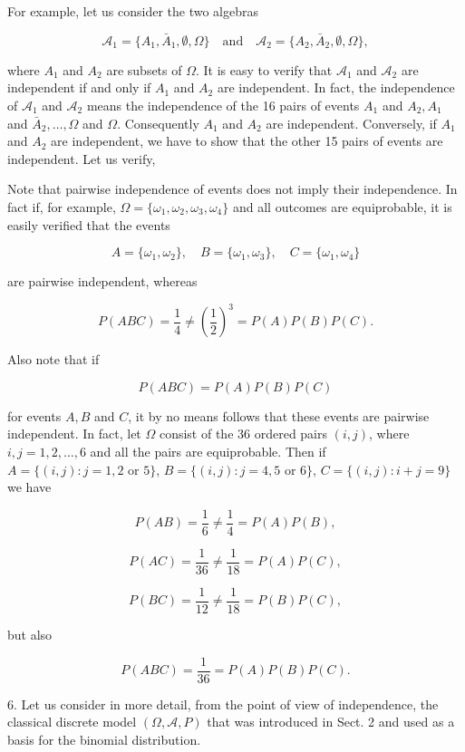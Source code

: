 For example, let us consider the two algebras

$$\mathcal{A}_1 = \{A_1, \bar{A}_1, \emptyset, \Omega\} \quad \text{and} \quad \mathcal{A}_2 = \{A_2, \bar{A}_2, \emptyset, \Omega\},$$

where $A_1$ and $A_2$ are subsets of $\Omega$. It is easy to verify that $\mathcal{A}_1$ and $\mathcal{A}_2$ are independent if and only if $A_1$ and $A_2$ are independent. In fact, the independence of $\mathcal{A}_1$ and $\mathcal{A}_2$ means the independence of the 16 pairs of events $A_1$ and $A_2, A_1$ and $\bar{A}_2, \ldots, \Omega$ and $\Omega$. Consequently $A_1$ and $A_2$ are independent. Conversely, if $A_1$ and $A_2$ are independent, we have to show that the other 15 pairs of events are independent. Let us verify,

Note that pairwise independence of events does not imply their independence. In fact if, for example, $\Omega = \{\omega_1, \omega_2, \omega_3, \omega_4\}$ and all outcomes are equiprobable, it is easily verified that the events

$$A = \{\omega_1, \omega_2\}, \quad B = \{\omega_1, \omega_3\}, \quad C = \{\omega_1, \omega_4\}$$

are pairwise independent, whereas

$$P(ABC) = \frac{1}{4} \neq (\frac{1}{2})^3 = P(A)P(B)P(C).$$

Also note that if

$$P(ABC) = P(A)P(B)P(C)$$

for events $A, B$ and $C$, it by no means follows that these events are pairwise independent. In fact, let $\Omega$ consist of the 36 ordered pairs $(i,j)$, where $i, j = 1, 2, \ldots, 6$ and all the pairs are equiprobable. Then if $A = \{(i,j) : j = 1, 2 \text{ or } 5\}$, $B = \{(i,j) : j = 4, 5 \text{ or } 6\}$, $C = \{(i,j) : i + j = 9\}$ we have

$$P(AB) = \frac{1}{6} \neq \frac{1}{4} = P(A)P(B),$$

$$P(AC) = \frac{1}{36} \neq \frac{1}{18} = P(A)P(C),$$

$$P(BC) = \frac{1}{12} \neq \frac{1}{18} = P(B)P(C),$$

but also

$$P(ABC) = \frac{1}{36} = P(A)P(B)P(C).$$

6. Let us consider in more detail, from the point of view of independence, the classical discrete model $(\Omega, \mathcal{A}, P)$ that was introduced in Sect. 2 and used as a basis for the binomial distribution.

